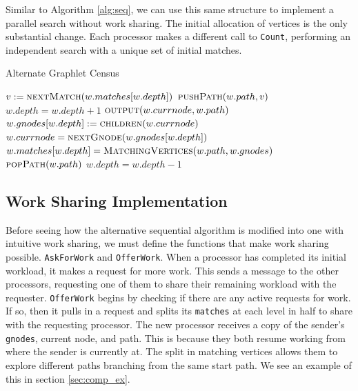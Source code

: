 \documentclass[12pt,twoside]{reedthesis}
\begin{document}
Similar to Algorithm \ref{alg:seq}, we can use this same structure to implement a parallel search without work sharing. The initial allocation of vertices is the only substantial change. Each processor makes a different call to \texttt{Count}, performing an independent search with a unique set of initial matches.



\begin{algorithm}
\caption{Alternate Graphlet Census}\label{alg:alt_seq}
\begin{algorithmic}[1]
            \State$v := \Call{nextMatch}{w.matches[w.depth]} $
            \State $\Call{pushPath}{w.path,v}$
            \State $w.depth = w.depth + 1$
                \State $\Call{output}{w.currnode, w.path}$
            \EndIf
            \State $w.gnodes[w.depth] :=  \Call{children}{w.currnode}$
            \State $w.currnode = \Call{nextGnode}{w.gnodes[w.depth]}$
            \State $w.matches[w.depth] =   \Call{MatchingVertices}{w.path,w.gnodes} $
        \Else
            \State $\Call{popPath}{w.path}$
            \State $w.depth = w.depth - 1$
        \EndIf
    \EndWhile
\EndProcedure
\end{algorithmic}
\end{algorithm}

\subsection{Work Sharing Implementation}

Before seeing how the alternative sequential algorithm is modified into one with intuitive work sharing, we must define the functions that make work sharing possible. \texttt{AskForWork} and \texttt{OfferWork}. When a processor has completed its initial workload, it makes a request for more work. This sends a message to the other processors, requesting one of them to share their remaining workload with the requester. \texttt{OfferWork} begins by checking if there are any active requests for work. If so, then it pulls in a request and splits its \texttt{matches} at each level in half to share with the requesting processor. The new processor receives a copy of the sender's \texttt{gnodes}, current node, and path. This is because they both resume working from where the sender is currently at. The split in matching vertices allows them to explore different paths branching from the same start path. We see an example of this in section \ref{sec:comp_ex}. 
\end{document}
